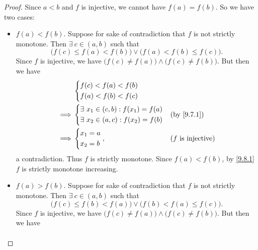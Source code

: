 \begin{proof}
  Since \(a < b\) and \(f\) is injective, we cannot have \(f(a) = f(b)\).
  So we have two cases:
  \begin{itemize}
    \item \(f(a) < f(b)\).
          Suppose for sake of contradiction that \(f\) is not strictly monotone.
          Then \(\exists\ c \in (a, b)\) such that
          \[
            \big(f(c) \leq f(a) < f(b)\big) \lor \big(f(a) < f(b) \leq f(c)\big).
          \]
          Since \(f\) is injective, we have \(\big(f(c) \neq f(a)\big) \land \big(f(c) \neq f(b)\big)\).
          But then we have
          \begin{align*}
                     & \begin{dcases}
                         f(c) < f(a) < f(b) \\
                         f(a) < f(b) < f(c)
                       \end{dcases}                                                         \\
            \implies & \begin{dcases}
                         \exists\ x_1 \in (c, b) : f(x_1) = f(a) \\
                         \exists\ x_2 \in (a, c) : f(x_2) = f(b) \\
                       \end{dcases} &  & \by{9.7.1}                                    \\
            \implies & \begin{dcases}
                         x_1 = a \\
                         x_2 = b
                       \end{dcases},                             &  & \text{(\(f\) is injective)}
          \end{align*}
          a contradiction.
          Thus \(f\) is strictly monotone.
          Since \(f(a) < f(b)\), by \cref{9.8.1} \(f\) is strictly monotone increasing.
    \item \(f(a) > f(b)\).
          Suppose for sake of contradiction that \(f\) is not strictly monotone.
          Then \(\exists\ c \in (a, b)\) such that
          \[
            \big(f(c) \leq f(b) < f(a)\big) \lor \big(f(b) < f(a) \leq f(c)\big).
          \]
          Since \(f\) is injective, we have \(\big(f(c) \neq f(a)\big) \land \big(f(c) \neq f(b)\big)\).
          But then we have
          \begin{align*}

\end{align*}
\end{itemize}
\end{proof}
